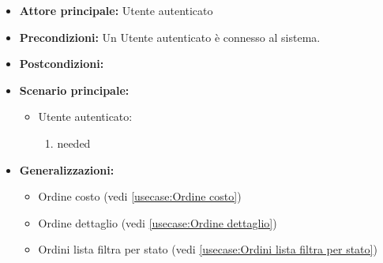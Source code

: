 \label{usecase:Ordini lista}
\begin{itemize}
\item \textbf{Attore principale:} Utente autenticato
\item \textbf{Precondizioni:}
Un Utente autenticato è connesso al sistema.
\item \textbf{Postcondizioni:}
\item \textbf{Scenario principale:}
\begin{itemize}
\item Utente autenticato:
\begin{enumerate}
\item needed
\end{enumerate}
\end{itemize}
\item \textbf{Generalizzazioni:}
\begin{itemize}
\item Ordine costo (vedi \autoref{usecase:Ordine costo})\item Ordine dettaglio (vedi \autoref{usecase:Ordine dettaglio})\item Ordini lista filtra per stato (vedi \autoref{usecase:Ordini lista filtra per stato})
\end{itemize}
\end{itemize}